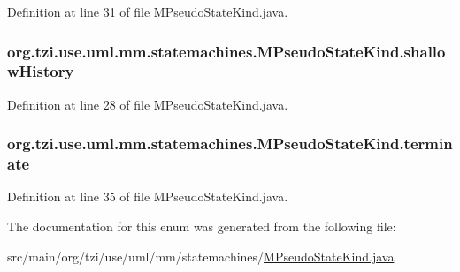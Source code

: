 Definition at line 31 of file M\-Pseudo\-State\-Kind.\-java.

\hypertarget{enumorg_1_1tzi_1_1use_1_1uml_1_1mm_1_1statemachines_1_1_m_pseudo_state_kind_a0b7501e32466c844126ef2e87e743869}{
\subsubsection[{shallow\-History}]{\setlength{\rightskip}{0pt plus 5cm}org.\-tzi.\-use.\-uml.\-mm.\-statemachines.\-M\-Pseudo\-State\-Kind.\-shallow\-History}}\label{enumorg_1_1tzi_1_1use_1_1uml_1_1mm_1_1statemachines_1_1_m_pseudo_state_kind_a0b7501e32466c844126ef2e87e743869}


Definition at line 28 of file M\-Pseudo\-State\-Kind.\-java.

\hypertarget{enumorg_1_1tzi_1_1use_1_1uml_1_1mm_1_1statemachines_1_1_m_pseudo_state_kind_afc970964dec0c9c8688448fb8ee0b6b8}{
\subsubsection[{terminate}]{\setlength{\rightskip}{0pt plus 5cm}org.\-tzi.\-use.\-uml.\-mm.\-statemachines.\-M\-Pseudo\-State\-Kind.\-terminate}}\label{enumorg_1_1tzi_1_1use_1_1uml_1_1mm_1_1statemachines_1_1_m_pseudo_state_kind_afc970964dec0c9c8688448fb8ee0b6b8}


Definition at line 35 of file M\-Pseudo\-State\-Kind.\-java.



The documentation for this enum was generated from the following file\-:\begin{DoxyCompactItemize}
\item 
src/main/org/tzi/use/uml/mm/statemachines/\hyperlink{_m_pseudo_state_kind_8java}{M\-Pseudo\-State\-Kind.\-java}\end{DoxyCompactItemize}
